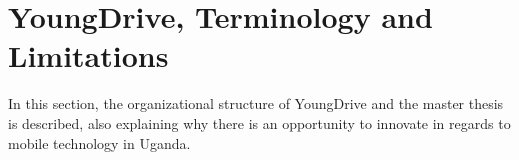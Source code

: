 \section{YoungDrive, Terminology and Limitations}

In this section, the organizational structure of YoungDrive and the master thesis is described, also explaining why there is an opportunity to innovate in regards to mobile technology in Uganda.









